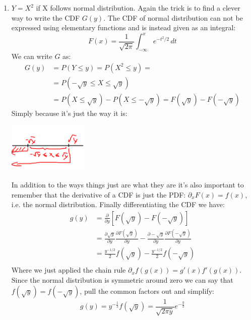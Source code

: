 \documentclass{article}
\newcommand{\1}{\mathbf{1}}
\begin{document}
\begin{enumerate}
    \newpage
    \item $Y=X^2$ if X follows normal distribution. Again the trick is to find a clever way to write the CDF $G(y)$. The CDF of normal distribution can not be expressed using elementary functions and is instead given as an integral:
    $$F(x) = \frac 1 {\sqrt{2\pi}} \int_{-\infty}^x e^{-t^2/2} \, dt$$
    We can write $G$ as:
    \begin{align*}
        G(y) &= P(Y\leq y) = P(X^2 \leq y) = \\
             &= P(-\sqrt{y} \leq X \leq \sqrt{y}) \\
             &= P(X \leq \sqrt{y}) - P( X\leq -\sqrt{y}) = F(\sqrt{y}) - F(-\sqrt{y})
    \end{align*}
    Simply because it's just the way it is: 
    \begin{center}
        \includegraphics[width=1.5in]{HW2Figures/Picasso.png}
    \end{center}
    In addition to the ways things just are what they are it's also important to remember that the derivative of a CDF is just the PDF: $\partial_x F(x) = f(x)$, i.e. the normal distribution. Finally differentiating the CDF we have:
    \begin{align*}
        g(y) &= \frac{\partial}{\partial y} \left[F(\sqrt y) - F(- \sqrt y) \right] \\
             &=  \frac{\partial \sqrt y }{\partial y} \frac{\partial F(\sqrt y) }{\partial y} - \frac{\partial - \sqrt y}{\partial y} \frac{\partial F(- \sqrt y) }{\partial y} \\
             & = \frac{y^{-1/2}}{2} f(\sqrt y) -  \frac{y^{-1/2}}{2} f(-\sqrt y) \\
    \end{align*}
    Where we just applied the chain rule $\partial_x f(g(x)) = g'(x) f'(g(x))$. Since the normal distribution is symmetric around zero we can say that $f(\sqrt y) = f(-\sqrt y)$, pull the common factors out and simplify:
    $$g(y) = y^{-\frac{1}{2}} f(\sqrt y) = \frac{1}{\sqrt{2\pi y}}e^{-\frac{y}{2}} $$
\end{enumerate}

\newpage
\end{document}

